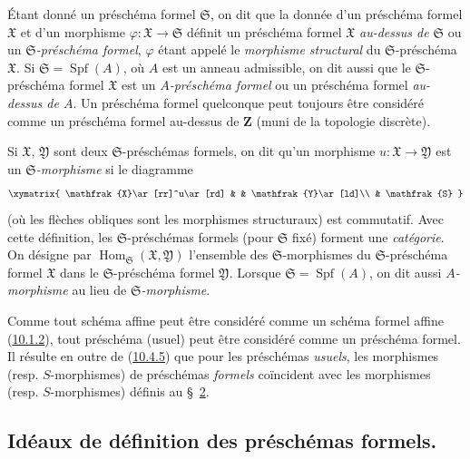 \begin{env}[10.4.7]
\label{I.10.4.7-fr}
Étant donné un préschéma formel $\mathfrak{S}$, on dit que la donnée d'un
préschéma formel $\mathfrak{X}$ et d'un morphisme
$\varphi:\mathfrak{X}\to\mathfrak{S}$ définit un préschéma formel
$\mathfrak{X}$ \emph{au-dessus de $\mathfrak{S}$} ou un
\emph{$\mathfrak{S}$-préschéma formel}, $\varphi$ étant appelé le
\emph{morphisme structural} du $\mathfrak{S}$-préschéma
$\mathfrak{X}$. Si $\mathfrak{S}=\operatorname{Spf}(A)$, où $A$ est un
anneau admissible, on dit aussi que le $\mathfrak{S}$-préschéma formel
$\mathfrak{X}$ est un \emph{$A$-préschéma formel} ou un préschéma formel
\emph{au-dessus de $A$}. Un préschéma formel quelconque peut toujours
être considéré comme un préschéma formel au-dessus de $\mathbf{Z}$ (muni
de la topologie discrète).

Si $\mathfrak{X}$, $\mathfrak{Y}$ sont deux $\mathfrak{S}$-préschémas
formels, on dit qu'un morphisme
$u:\mathfrak{X}\to\mathfrak{Y}$ est un
\emph{$\mathfrak{S}$-morphisme} si le diagramme
\[
  \xymatrix{
    \mathfrak{X}\ar[rr]^u\ar[rd] & &
    \mathfrak{Y}\ar[ld]\\
    & \mathfrak{S}
  }
\]
(où les flèches obliques sont les morphismes structuraux) est
commutatif. Avec cette définition, les $\mathfrak{S}$-préschémas formels
(pour $\mathfrak{S}$ fixé) forment une \emph{catégorie}. On désigne par
$\operatorname{Hom}_{\mathfrak{S}}(\mathfrak{X},\mathfrak{Y})$
l'ensemble des $\mathfrak{S}$-morphismes du $\mathfrak{S}$-préschéma
formel $\mathfrak{X}$ dans le $\mathfrak{S}$-préschéma formel
$\mathfrak{Y}$. Lorsque $\mathfrak{S}=\operatorname{Spf}(A)$, on dit
aussi \emph{$A$-morphisme} au lieu de
\emph{$\mathfrak{S}$-morphisme}.
\end{env}

\begin{env}[10.4.8]
\label{I.10.4.8-fr}
Comme tout schéma affine peut être considéré comme un schéma formel affine
(\hyperref[I.10.1.2-fr]{10.1.2}), tout préschéma (usuel) peut être
considéré comme un préschéma formel. Il résulte en outre de
(\hyperref[I.10.4.5-fr]{10.4.5}) que pour les préschémas \emph{usuels},
les morphismes (resp. $S$-morphismes) de préschémas \emph{formels}
coïncident avec les morphismes (resp. $S$-morphismes) définis au
\S~\hyperref[section:I.2-fr]{2}.
\end{env}

\subsection{Idéaux de définition des préschémas formels.}
\label{subsection:I.10.5-fr}

